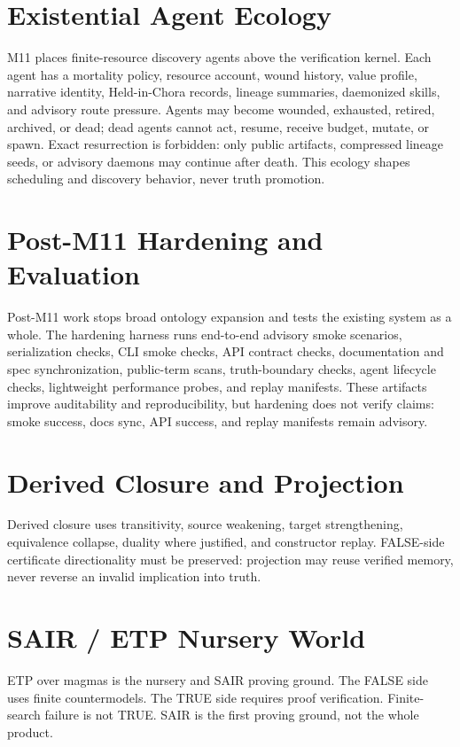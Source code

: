 \documentclass[11pt,a4paper]{article}
\newcommand{\ETP}{\textsc{ETP}}
\newcommand{\SAIR}{\textsc{SAIR}}
\begin{document}
\section{Existential Agent Ecology}
M11 places finite-resource discovery agents above the verification kernel. Each
agent has a mortality policy, resource account, wound history, value profile,
narrative identity, Held-in-Chora records, lineage summaries, daemonized skills,
and advisory route pressure. Agents may become wounded, exhausted, retired,
archived, or dead; dead agents cannot act, resume, receive budget, mutate, or
spawn. Exact resurrection is forbidden: only public artifacts, compressed
lineage seeds, or advisory daemons may continue after death. This ecology shapes
scheduling and discovery behavior, never truth promotion.

\section{Post-M11 Hardening and Evaluation}
Post-M11 work stops broad ontology expansion and tests the existing system as a
whole. The hardening harness runs end-to-end advisory smoke scenarios,
serialization checks, CLI smoke checks, API contract checks, documentation and
spec synchronization, public-term scans, truth-boundary checks, agent lifecycle
checks, lightweight performance probes, and replay manifests. These artifacts
improve auditability and reproducibility, but hardening does not verify claims:
smoke success, docs sync, API success, and replay manifests remain advisory.

\section{Derived Closure and Projection}
Derived closure uses transitivity, source weakening, target strengthening, equivalence collapse, duality where justified, and constructor replay. FALSE-side certificate directionality must be preserved: projection may reuse verified memory, never reverse an invalid implication into truth.

\section{SAIR / ETP Nursery World}
\ETP{} over magmas is the nursery and \SAIR{} proving ground. The FALSE side uses finite countermodels. The TRUE side requires proof verification. Finite-search failure is not TRUE. \SAIR{} is the first proving ground, not the whole product.
\end{document}
